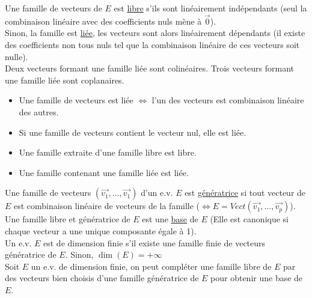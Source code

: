   Une famille de vecteurs de $E$ est \underline{libre} s'ils sont linéairement indépendants (seul la combinaison linéaire avec des coefficients nuls mène à $\vec 0$).\\
  
  Sinon, la famille est \underline{liée}, les vecteurs sont alors linéairement dépendants (il existe des coefficients non tous nuls tel que la combinaison linéaire de ces vecteurs soit nulle).\\
  
  Deux vecteurs formant une famille liée sont colinéaires.
  Trois vecteurs formant une famille liée sont coplanaires.\\
  
  \begin{itemize}
    \item Une famille de vecteurs est liée $\iff$ l'un des vecteurs est combinaison linéaire des autres.
    \item Si une famille de vecteurs contient le vecteur nul, elle est liée.
    \item Une famille extraite d'une famille libre est libre.
    \item Une famille contenant une famille liée est liée.\\
  \end{itemize}
  
  Une famille de vecteurs $(\vec{v_1}, \dots, \vec{v_1})$ d'un e.v. $E$ est \underline{génératrice} si tout vecteur de $E$ est combinaison linéaire de vecteurs de la famille ($\iff E = Vect(\vec{v_1}, \dots, \vec{v_p})$).\\
  Une famille libre et génératrice de $E$ est une \underline{base} de $E$ (Elle est canonique si chaque vecteur a une unique composante égale à 1).\\
  
  Un e.v. $E$ est de dimension finie s'il existe une famille finie de vecteurs génératrice de $E$.
  Sinon, $\dim(E) = +\infty$\\
  
  Soit $E$ un e.v. de dimension finie, on peut compléter une famille libre de $E$ par des vecteurs bien choisis d'une famille génératrice de $E$ pour obtenir une base de $E$.
  